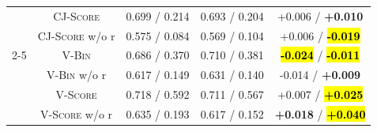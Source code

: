 \begin{table}[t]
\begin{tabular}{@{}c|c|ccc@{}}
         & \textsc{CJ-Score}       & 0.699 / 0.214   & 0.693 / 0.204   & +0.006 / \textbf{+0.010} \\
         & \textsc{CJ-Score} w/o r & 0.575 / 0.084   & 0.569 / 0.104   & +0.006 / \hl{\textbf{-0.019}} \\
        \cmidrule{2-5}
         & \textsc{V-Bin}          & 0.686 / 0.370   & 0.710 / 0.381   & \hl{\textbf{-0.024}} / \hl{\textbf{-0.011}} \\
         & \textsc{V-Bin} w/o r    & 0.617 / 0.149   & 0.631 / 0.140   & -0.014 / \textbf{+0.009} \\
         & \textsc{V-Score}        & 0.718 / 0.592   & 0.711 / 0.567   & +0.007 / \hl{\textbf{+0.025}} \\
         & \textsc{V-Score} w/o r  & 0.635 / 0.193   & 0.617 / 0.152   & \textbf{+0.018} / \hl{\textbf{+0.040}} \\
        \bottomrule
    \end{tabular}
    \vspace{-10pt}
\end{table}